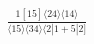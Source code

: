 \documentclass[varwidth, border=5pt]{standalone}
\begin{document}
\begin{my}
$\begin{gathered}
\scriptscriptstyle\frac{1[15]⟨24⟩⟨14⟩}{⟨15⟩⟨34⟩⟨2|1+5|2]}
\end{gathered}$
\end{my}
\end{document}
